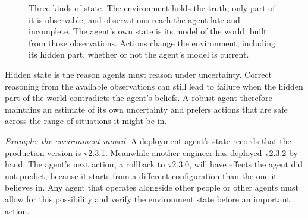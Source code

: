 \documentclass[11pt]{book}
\begin{document}
\begin{figure}[htbp]
\centering
{}
\caption{Three kinds of state. The environment holds the truth; only part of it is observable, and observations reach the agent late and incomplete. The agent's own state is its model of the world, built from those observations. Actions change the environment, including its hidden part, whether or not the agent's model is current.}
\label{fig:state-kinds}
\end{figure}

Hidden state is the reason agents must reason under uncertainty. Correct reasoning from the available observations can still lead to failure when the hidden part of the world contradicts the agent's beliefs. A robust agent therefore maintains an estimate of its own uncertainty and prefers actions that are safe across the range of situations it might be in.

\textit{Example: the environment moved.} A deployment agent's state records that the production version is v2.3.1. Meanwhile another engineer has deployed v2.3.2 by hand. The agent's next action, a rollback to v2.3.0, will have effects the agent did not predict, because it starts from a different configuration than the one it believes in. Any agent that operates alongside other people or other agents must allow for this possibility and verify the environment state before an important action.
\end{document}
